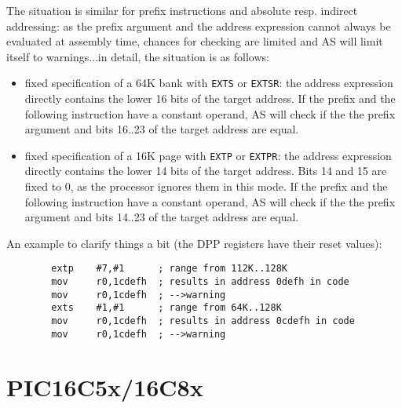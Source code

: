 \documentclass[12pt,twoside]{report}
\newcommand{\tty}[1]{{\tt #1}}
\begin{document}
The situation is similar for prefix instructions and absolute resp.
indirect addressing: as the prefix argument and the address
expression cannot always be evaluated at assembly time, chances for
checking are limited and AS will limit itself to warnings...in
detail, the situation is as follows:
\begin{itemize}
\item{fixed specification of a 64K bank with \tty{EXTS} or \tty{EXTSR}: the address
      expression directly contains the lower 16 bits of the target
      address.  If the prefix and the following instruction have a
      constant operand, AS will check if the the prefix argument and bits
      16..23 of the target address are equal.}
\item{fixed specification of a 16K page with \tty{EXTP} or \tty{EXTPR}: the address
      expression directly contains the lower 14 bits of the target
      address.  Bits 14 and 15 are fixed to 0, as the processor ignores
      them in this mode.  If the prefix and the following instruction
      have a constant operand, AS will check if the the prefix argument
      and bits 14..23 of the target address are equal.}
\end{itemize}
An example to clarify things a bit (the DPP registers have their
reset values):
\begin{verbatim}
        extp    #7,#1      ; range from 112K..128K
        mov     r0,1cdefh  ; results in address 0defh in code
        mov     r0,1cdefh  ; -->warning
        exts    #1,#1      ; range from 64K..128K
        mov     r0,1cdefh  ; results in address 0cdefh in code
        mov     r0,1cdefh  ; -->warning
\end{verbatim}


\section{PIC16C5x/16C8x}
\end{document}
